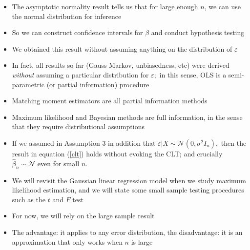 \documentclass[notes=show]{beamer}
\begin{document}
\begin{frame}%


\begin{itemize}
\item The asymptotic normality result tells us that for large enough $n$, we
can use the normal distribution for inference

\item So we can construct confidence intervals for $\beta $ and conduct
hypothesis testing

\item We obtained this result without assuming anything on the distribution
of $\varepsilon $

\item In fact, all results so far (Gauss Markov, unbiasedness, etc) were
derived \textit{without} assuming a particular distribution for $\varepsilon
;$ in this sense, OLS is a semi-parametric (or partial information) procedure

\item Matching moment estimators are all partial information methods

\item Maximum likelihood and Bayesian methods are full information, in the
sense that they require distributional assumptions
\end{itemize}

\end{frame}%

\begin{frame}%


\begin{itemize}
\item If we assumed in Assumption 3 in addition that $\varepsilon |X\sim 
\mathcal{N}(0,\sigma ^{2}I_{n}),$ then the result in equation (\ref{clt})
holds without evoking the CLT; and crucially $\widehat{\beta }_{n}\sim 
\mathcal{N}$ even for small $n.$

\item We will revisit the Gaussian linear regression model when we study
maximum likelihood estimation, and we will state some small sample testing
procedures such as the $t$ and $F$ test

\item For now, we will rely on the large sample result

\item The advantage: it applies to any error distribution, the disadvantage:
it is an approximation that only works when $n$ is large
\end{itemize}

\end{frame}%
\end{document}
